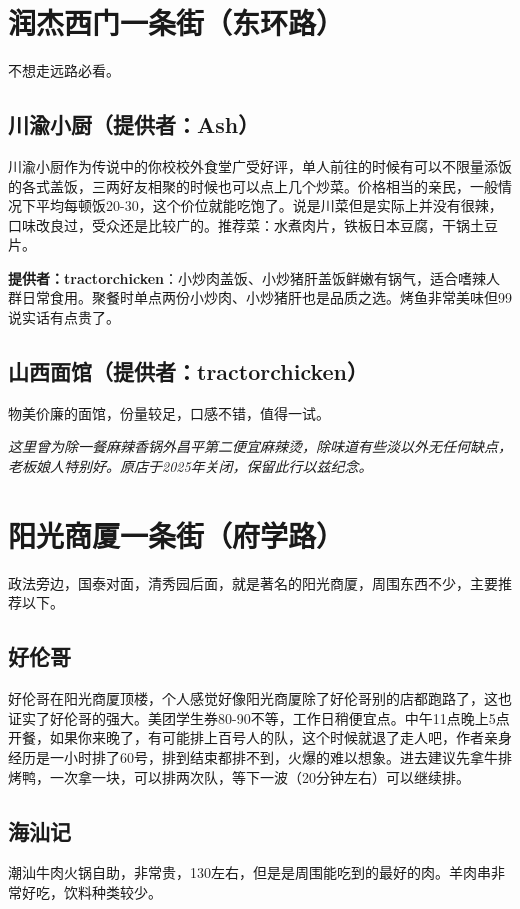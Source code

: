 \documentclass[lang=cn,color=blue,12pt,scheme=chinese,chinesefont=nofont]{elegantbook}
\begin{document}
\section{润杰西门一条街（东环路）}
\setlength{\parindent}{2em}
不想走远路必看。

\subsection{川渝小厨（提供者：Ash）}
川渝小厨作为传说中的你校校外食堂广受好评，单人前往的时候有可以不限量添饭的各式盖饭，三两好友相聚的时候也可以点上几个炒菜。价格相当的亲民，一般情况下平均每顿饭20-30，这个价位就能吃饱了。说是川菜但是实际上并没有很辣，口味改良过，受众还是比较广的。推荐菜：水煮肉片，铁板日本豆腐，干锅土豆片。

\textbf{提供者：tractorchicken}：小炒肉盖饭、小炒猪肝盖饭鲜嫩有锅气，适合嗜辣人群日常食用。聚餐时单点两份小炒肉、小炒猪肝也是品质之选。烤鱼非常美味但99说实话有点贵了。

\subsection{山西面馆（提供者：tractorchicken）}
物美价廉的面馆，份量较足，口感不错，值得一试。

\textit{这里曾为除一餐麻辣香锅外昌平第二便宜麻辣烫，除味道有些淡以外无任何缺点，老板娘人特别好。原店于2025年关闭，保留此行以兹纪念。}

\section{阳光商厦一条街（府学路）}
\setlength{\parindent}{2em}
政法旁边，国泰对面，清秀园后面，就是著名的阳光商厦，周围东西不少，主要推荐以下。

\subsection{好伦哥}
好伦哥在阳光商厦顶楼，个人感觉好像阳光商厦除了好伦哥别的店都跑路了，这也证实了好伦哥的强大。美团学生券80-90不等，工作日稍便宜点。中午11点晚上5点开餐，如果你来晚了，有可能排上百号人的队，这个时候就退了走人吧，作者亲身经历是一小时排了60号，排到结束都排不到，火爆的难以想象。进去建议先拿牛排烤鸭，一次拿一块，可以排两次队，等下一波（20分钟左右）可以继续排。

\subsection{海汕记}
潮汕牛肉火锅自助，非常贵，130左右，但是是周围能吃到的最好的肉。羊肉串非常好吃，饮料种类较少。
\end{document}
